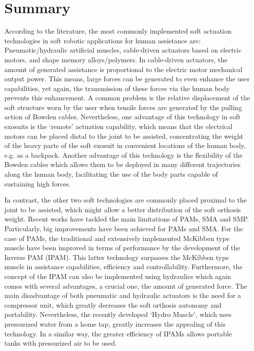 \section{Summary}

According to the literature, the most commonly implemented soft actuation technologies in soft robotic applications for human assistance are: Pneumatic/hydraulic artificial muscles, cable-driven actuators based on electric motors, and shape memory alloys/polymers.  In cable-driven actuators, the amount of generated assistance is proportional to the electric motor mechanical output power. This means, large forces can be generated to even enhance the user capabilities, yet again, the transmission of these forces via the human body prevents this enhancement. A common problem is the relative displacement of the soft structure worn by the user when tensile forces are generated by the pulling action of Bowden cables. Nevertheless, one advantage of this technology in soft exosuits is the `remote' actuation capability, which means that the electrical motors can be placed distal to the joint to be assisted, concentrating the weight of the heavy parts of the soft exosuit in convenient locations of the human body, e.g. as a backpack. Another advantage of this technology is the flexibility of the Bowden cables which allows them to be deployed in many different trajectories along the human body, facilitating the use of the body parts capable of sustaining high forces.

In contrast, the other two soft technologies are commonly placed proximal to the joint to be assisted, which might allow a better distribution of the soft orthosis weight. Recent works have tackled the main limitations of PAMs, SMA and SMP. Particularly, big improvements have been achieved for PAMs and SMA. For the case of PAMs, the traditional and extensively implemented McKibben type muscle have been improved in terms of performance by the development of the Inverse PAM (IPAM). This latter technology surpasses the McKibben type muscle in assistance capabilities, efficiency and controllability. Furthermore, the concept of the IPAM can also be implemented using hydraulics which again comes with several advantages, a crucial one, the amount of generated force. The main disadvantage of both pneumatic and hydraulic actuators is the need for a compressor unit, which greatly decreases the soft orthosis autonomy and portability. Nevertheless, the recently developed `Hydro Muscle', which uses pressurized water from a home tap, greatly increases the appealing of this technology. In a similar way, the greater efficiency of IPAMs allows portable tanks with pressurized air to be used.

